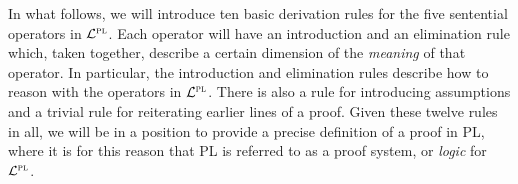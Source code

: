 %
%

In what follows, we will introduce ten basic derivation rules for the five sentential operators in $\mathcal{L}^{\textsc{pl}}$.
Each operator will have an introduction and an elimination rule which, taken together, describe a certain dimension of the \textit{meaning} of that operator.
In particular, the introduction and elimination rules describe how to reason with the operators in $\mathcal{L}^{\textsc{pl}}$.
There is also a rule for introducing assumptions and a trivial rule for reiterating earlier lines of a proof.
Given these twelve rules in all, we will be in a position to provide a precise definition of a proof in PL, where it is for this reason that PL is referred to as a proof system, or \textit{logic} for $\mathcal{L}^{\textsc{pl}}$.

